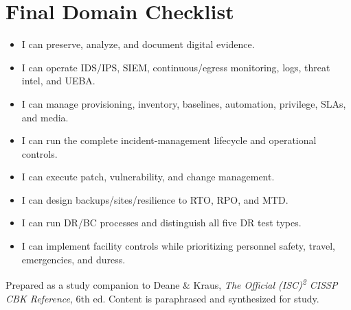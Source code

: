 \documentclass[10pt,letterpaper]{article}
\begin{document}
\section{\color{navy}Final Domain Checklist}
\begin{itemize}[label=\(\square\)]
\item I can preserve, analyze, and document digital evidence.
\item I can operate IDS/IPS, SIEM, continuous/egress monitoring, logs, threat intel, and UEBA.
\item I can manage provisioning, inventory, baselines, automation, privilege, SLAs, and media.
\item I can run the complete incident-management lifecycle and operational controls.
\item I can execute patch, vulnerability, and change management.
\item I can design backups/sites/resilience to RTO, RPO, and MTD.
\item I can run DR/BC processes and distinguish all five DR test types.
\item I can implement facility controls while prioritizing personnel safety, travel, emergencies, and duress.
\end{itemize}
\vfill{\footnotesize\color{teal}Prepared as a study companion to Deane \& Kraus, \textit{The Official (ISC)\textsuperscript{2} CISSP CBK Reference}, 6th ed. Content is paraphrased and synthesized for study.}
\end{document}
